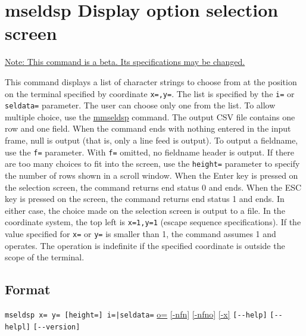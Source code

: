 
%

\section{mseldsp Display option selection screen\label{sect:mseldsp}}
\underline{Note: This command is a beta. Its specifications may be changed.}

This command displays a list of character strings to choose from at the position on the terminal specified by coordinate \verb|x=,y=|. The list is specified by the \verb|i=| or \verb|seldata=| parameter. 
The user can choose only one from the list. To allow multiple choice, use the \hyperref[sect:mmseldsp]{mmseldsp} command. 
The output CSV file contains one row and one field. When the command ends with nothing entered in the input frame, null is output (that is, only a line feed is output). To output a fieldname, use the \verb|f=| parameter. With \verb|f=| omitted, no fieldname header is output. 
If there are too many choices to fit into the screen, use the \verb|height=| parameter to specify the number of rows shown in a scroll window.
When the Enter key is pressed on the selection screen, the command returns end status 0 and ends. When the ESC key is pressed on the screen, the command returns end status 1 and ends. In either case, the choice made on the selection screen is output to a file.
In the coordinate system, the top left is \verb|x=1,y=1| (escape sequence specifications). If the value specified for \verb|x=| or \verb|y=| is smaller than 1, the command assumes 1 and operates. The operation is indefinite if the specified coordinate is outside the scope of the terminal.

\subsection*{Format}
\verb/mseldsp x= y= [height=] i=|seldata=/
\hyperref[sect:option_o]{o=}
\hyperref[sect:option_nfn]{[-nfn]} 
\hyperref[sect:option_nfno]{[-nfno]}  
\hyperref[sect:option_x]{[-x]}
\verb|[--help]|
\verb|[--helpl]|
\verb|[--version]|\\

